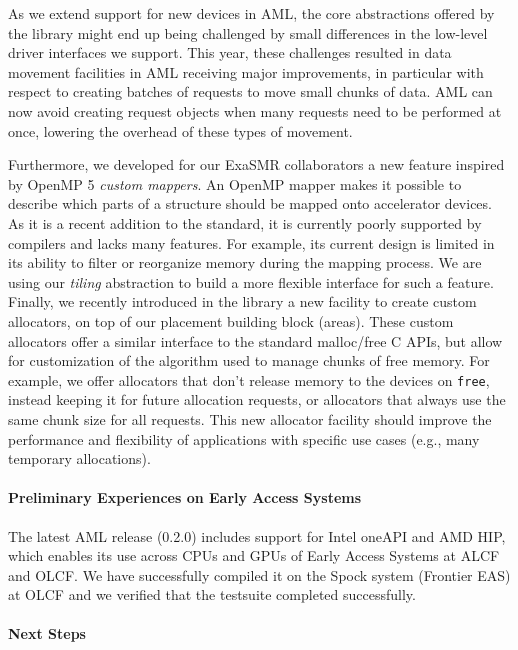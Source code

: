 As we extend support for new devices in AML, the core abstractions offered
by the library might end up being challenged by small differences in the
low-level driver interfaces we support. This year, these challenges
resulted in data movement facilities in AML receiving major improvements,
in particular with respect to creating batches of requests to move small
chunks of data. AML can now avoid creating request objects when many
requests need to be performed at once, lowering the overhead of these types
of movement.

Furthermore, we developed for our ExaSMR collaborators a new feature
inspired by OpenMP 5 \emph{custom mappers}. An OpenMP mapper makes it
possible to describe which parts of a structure should be mapped onto
accelerator devices. As it is a recent addition to the standard, it is
currently poorly supported by compilers and lacks many features. For
example, its current design is limited in its ability to filter or
reorganize memory during the mapping process. We are using our
\emph{tiling} abstraction to build a more flexible interface for such a
feature.    Finally, we recently introduced in the library a new facility
to create custom allocators, on top of our placement building block
(areas). These custom allocators offer a similar interface to the standard
malloc/free C APIs, but allow for customization of the algorithm used to
manage chunks of free memory. For example, we offer allocators that don't
release memory to the devices on \texttt{free}, instead keeping it for
future allocation requests, or allocators that always use the same chunk
size for all requests. This new allocator facility should improve the
performance and flexibility of applications with specific use cases (e.g.,
many temporary allocations).

\paragraph{Preliminary Experiences on Early Access Systems}

The latest AML release (0.2.0) includes support for Intel oneAPI and AMD
HIP, which enables its use across CPUs and GPUs of Early Access Systems at
ALCF and OLCF.  We have successfully compiled it on the Spock system
(Frontier EAS) at OLCF and we verified that the testsuite completed
successfully.

\paragraph{Next Steps}

